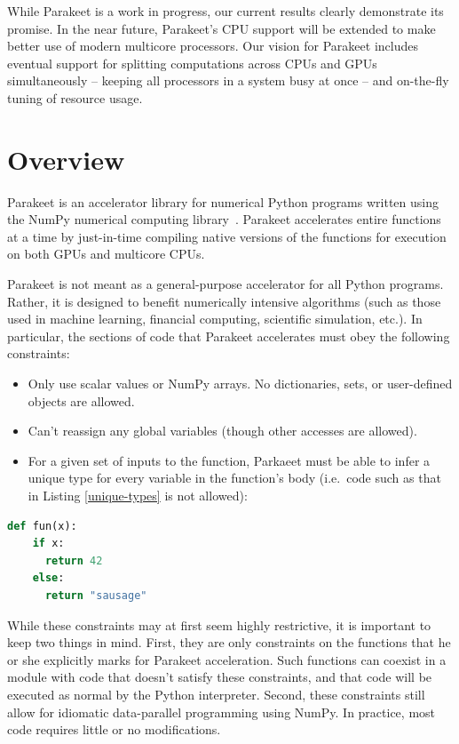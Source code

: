 \documentclass[10pt,twocolumn]{article}
\begin{document}
While Parakeet is a work in progress, our current results clearly demonstrate its promise.  In the near future, Parakeet's CPU support will be extended to make better use of modern multicore processors.  Our vision for Parakeet includes eventual support for splitting computations across CPUs and GPUs simultaneously -- keeping all processors in a system busy at once -- and on-the-fly tuning of resource usage.

\section{Overview}
\label{overview}
Parakeet is an accelerator library for numerical Python programs written using the NumPy numerical computing library~\cite{Oliphant07}.  Parakeet accelerates entire functions at a time by just-in-time compiling native versions of the functions for execution on both GPUs and multicore CPUs.

Parakeet is not meant as a general-purpose accelerator for all Python programs.  Rather, it is designed to benefit numerically intensive algorithms (such as those used in machine learning, financial computing, scientific simulation, etc.).  In particular, the sections of code that Parakeet accelerates must obey the following constraints:

\begin{itemize}
 \item Only use scalar values or NumPy arrays.  No dictionaries, sets, or user-defined objects are allowed.
 \item Can't reassign any global variables (though other accesses are allowed).
 \item For a given set of inputs to the function, Parkaeet must be able to infer a unique type for every variable in the function's body (i.e.~code such as that in Listing \ref{unique-types} is not allowed):
\end{itemize}
\begin{lstlisting}[numbers=none,label=unique-types,caption=Unique Types Example,language=Python,frame=single]
  def fun(x):
    if x:
      return 42
    else:
      return "sausage"
\end{lstlisting}

While these constraints may at first seem highly restrictive, it is important to keep two things in mind.  First, they are only constraints on the functions that he or she explicitly marks for Parakeet acceleration.  Such functions can coexist in a module with code that doesn't satisfy these constraints, and that code will be executed as normal by the Python interpreter.  Second, these constraints still allow for idiomatic data-parallel programming using NumPy.  In practice, most code requires little or no modifications.
\end{document}
